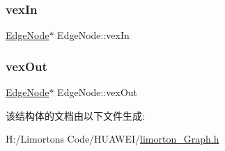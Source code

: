 \mbox{\label{struct_edge_node_a3dc9e3b6e0549a5fcd706d0400cacfa8}} 
\subsubsection{\texorpdfstring{vex\+In}{vexIn}}
{\footnotesize\ttfamily \hyperlink{struct_edge_node}{Edge\+Node}$\ast$ Edge\+Node\+::vex\+In}

\mbox{\label{struct_edge_node_ad233cb7a63c1a934e27d8c41fd3dda19}} 
\subsubsection{\texorpdfstring{vex\+Out}{vexOut}}
{\footnotesize\ttfamily \hyperlink{struct_edge_node}{Edge\+Node}$\ast$ Edge\+Node\+::vex\+Out}



该结构体的文档由以下文件生成\+:\begin{DoxyCompactItemize}
\item 
H\+:/\+Limorton\textquotesingle{}s Code/\+H\+U\+A\+W\+E\+I/\hyperlink{limorton___graph_8h}{limorton\+\_\+\+Graph.\+h}\end{DoxyCompactItemize}
